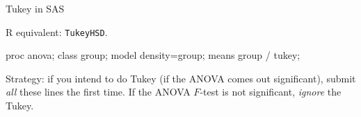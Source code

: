 \documentclass[unknownkeysallowed]{beamer}\usepackage[]{graphicx}\usepackage[]{color}
\begin{document}

\begin{frame}[fragile]{Tukey in SAS}
  
  R equivalent: \texttt{TukeyHSD}.

\begin{Sascode}[store=ii]
proc anova;
  class group;
  model density=group;
  means group / tukey;
\end{Sascode}

Strategy: if you intend to do Tukey (if the ANOVA comes out
significant), submit \emph{all} these lines the first time. If the
ANOVA $F$-test is not significant, \emph{ignore} the Tukey.
   
\end{frame}
\end{document}
